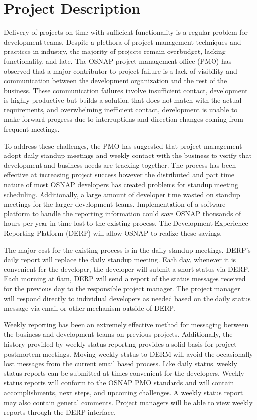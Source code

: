 \chapter*{Project Description}
Delivery of projects on time with sufficient functionality is a regular problem for development teams. Despite a plethora of project management techniques and practices in industry, the majority of projects remain overbudget, lacking functionality, and late. The OSNAP project management office (PMO) has observed that a major contributor to project failure is a lack of visibility and communication between the development organization and the rest of the business. These communication failures involve insufficient contact, development is highly productive but builds a solution that does not match with the actual requirements, and overwhelming inefficient contact, development is unable to make forward progress due to interruptions and direction changes coming from frequent meetings.

To address these challenges, the PMO has suggested that project management adopt daily standup meetings and weekly contact with the business to verify that development and business needs are tracking together. The process has been effective at increasing project success however the distributed and part time nature of most OSNAP developers has created problems for standup meeting scheduling. Additionally, a large amount of developer time wasted on standup meetings for the larger development teams. Implementation of a software platform to handle the reporting information could save OSNAP thousands of hours per year in time lost to the existing process. The Development Experience Reporting Platform (DERP) will allow OSNAP to realize these savings.

The major cost for the existing process is in the daily standup meetings. DERP's daily report will replace the daily standup meeting. Each day, whenever it is convenient for the developer, the developer will submit a short status via DERP. Each morning at 6am, DERP will send a report of the status messages received for the previous day to the responsible project manager. The project manager will respond directly to individual developers as needed based on the daily status message via email or other mechanism outside of DERP.

Weekly reporting has been an extremely effective method for messaging between the business and development teams on previous projects. Additionally, the history provided by weekly status reporting provides a solid basis for project postmortem meetings. Moving weekly status to DERM will avoid the occasionally lost messages from the current email based process. Like daily status, weekly status reports can be submitted at times convenient for the developers. Weekly status reports will conform to the OSNAP PMO standards and will contain accomplishments, next steps, and upcoming challenges. A weekly status report may also contain general comments. Project managers will be able to view weekly reports through the DERP interface.